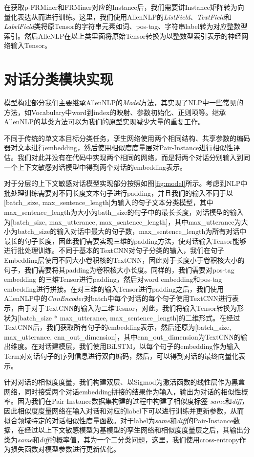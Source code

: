 在获取p-FRMiner和FRMiner对应的Instance后，我们需要讲Instance矩阵转为向量化表达从而进行训练。这里，我们使用AllenNLP的\textit{ListField}、\textit{TextField}和\textit{LabelField}类将原Tensor的字符串元素如词、pos-tag、字符串label转为对应整数型索引。然后AlleNLP在以上类里面将原始Tensor转换为以整数型索引表示的神经网络输入Tensor。

\section{对话分类模块实现}

模型构建部分我们主要继承AllenNLP的\textit{Model}方法，其实现了NLP中一些常见的方法，如Vocabulary中word到index的映射、参数初始化、正则项等。继承AllenNLP的基类方法可以为我们的原型实现减少大量的重复工作。

不同于传统的单文本目标分类任务，孪生网络使用两个相同结构、共享参数的编码器对文本进行embedding，然后使用相似度度量层对Pair-Instance进行相似性评估。我们对此并没有在代码中实现两个相同的网络，而是将两个对话分别输入到同一个上下文敏感对话模型中得到两个对话的embedding表示。

对于分层的上下文敏感对话模型实现部分按照如图\ref{fig:model}所示。考虑到NLP中批处理训练需要对不同长度文本句子进行padding，并且我们的输入不同于以[batch\_size, max\_sentence\_length]为输入的句子文本分类模型，其中max\_sentence\_length为大小为bath\_size的句子中的最长长度，对话模型的输入为[batch\_size, max\_utterance, max\_sentence\_length]，其中max\_utterance为大小为batch\_size的输入对话中最大的句子数，max\_sentence\_length为所有对话中最长的句子长度，因此我们需要实现三维的padding方法，使对话输入Tensor能够进行批处理训练。不同于基本的TextCNN对句子分类的输入，我们在句子Embedding层使用不同大小卷积核的TextCNN，因此对于长度小于卷积核大小的句子，我们需要将其padding为卷积核大小长度。同样的，我们需要对pos-tag embedding 的三维Tensor进行padding，然后对word embedding和pos-tag embedding进行拼接。在对三维的输入Tensor进行padding之后，我们使用AllenNLP中的\textit{CnnEncoder}对batch中每个对话的每个句子使用TextCNN进行表示，由于对于TextCNN的输入为二维Tesnor，对此，我们将输入Tensor转换为形状为[batch\_size * max\_utterance, max\_sentence\_length]的二维形式。在经过TextCNN后，我们获取所有句子的embedding表示，然后还原为[batch\_size, max\_utterance, cnn\_out\_dimension]，其中cnn\_out\_dimension为TextCNN的输出维度。在对话建模层，我们使用BiLSTM，以每个句子的embedding作为输入Term对对话句子的序列信息进行双向编码，然后，可以得到对话的最终向量化表示。

针对对话的相似度度量，我们构建双层、以Sigmod为激活函数的线性层作为黑盒网络，同时接受两个对话embedding拼接的结果作为输入，输出为对话的相似性概率。因为我们在Pair-Instance数据集构建的过程中构建了相似度标签-\textit{same}和\textit{diff}，因此相似度度量网络在输入对话和对应的label下可以进行训练并更新参数，从而拟合领域特定的对话相似性度量函数。对于label为\textit{same}和\textit{diff}的Pair-Instance数据，在经过以上下文敏感模型为基模型的孪生网络和相似度度量层之后，其输出分类为\textit{same}和\textit{diff}的概率值，其为一个二分类问题，这里，我们使用cross-entropy作为损失函数对模型参数进行更新优化。


